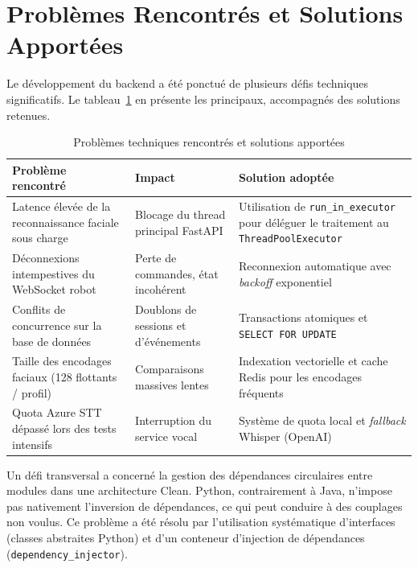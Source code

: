 \documentclass[a4paper,12pt]{report}
\begin{document}
	\section{Problèmes Rencontrés et Solutions Apportées}
	
	Le développement du backend a été ponctué de plusieurs défis
	techniques significatifs. Le tableau~\ref{tab:problemes} en
	présente les principaux, accompagnés des solutions retenues.
	
	\begin{table}[htbp]
		\centering
		\caption{Problèmes techniques rencontrés et solutions apportées}
		\label{tab:problemes}
		\renewcommand{\arraystretch}{1.4}
		\begin{tabularx}{\textwidth}{|p{3.8cm}|p{3.2cm}|X|}
			\hline
			\textbf{Problème rencontré} & \textbf{Impact} & \textbf{Solution adoptée} \\
			\hline
			Latence élevée de la reconnaissance faciale sous charge
			& Blocage du thread principal FastAPI
			& Utilisation de \texttt{run\_in\_executor} pour déléguer le
			traitement au \texttt{ThreadPoolExecutor} \\
			\hline
			Déconnexions intempestives du WebSocket robot
			& Perte de commandes, état incohérent
			& Reconnexion automatique avec \textit{backoff} exponentiel \\
			\hline
			Conflits de concurrence sur la base de données
			& Doublons de sessions et d'événements
			& Transactions atomiques et \texttt{SELECT FOR UPDATE} \\
			\hline
			Taille des encodages faciaux (128 flottants / profil)
			& Comparaisons massives lentes
			& Indexation vectorielle et cache Redis pour les encodages
			fréquents \\
			\hline
			Quota Azure STT dépassé lors des tests intensifs
			& Interruption du service vocal
			& Système de quota local et \textit{fallback} Whisper (OpenAI) \\
			\hline
		\end{tabularx}
	\end{table}
	
	Un défi transversal a concerné la gestion des dépendances
	circulaires entre modules dans une architecture Clean. Python,
	contrairement à Java, n'impose pas nativement l'inversion de
	dépendances, ce qui peut conduire à des couplages non voulus.
	Ce problème a été résolu par l'utilisation systématique
	d'interfaces (classes abstraites Python) et d'un conteneur
	d'injection de dépendances (\texttt{dependency\_injector}).
	
\end{document}
